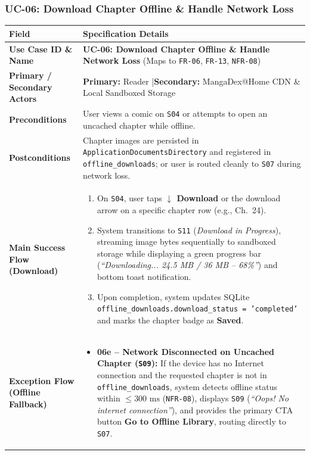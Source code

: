 \subsubsection{UC-06: Download Chapter Offline \& Handle Network Loss}
\begin{table}[H]
\footnotesize
\renewcommand{\arraystretch}{1.22}
\begin{tabularx}{\textwidth}{L{3.2cm} Y}
\toprule
{}
\textbf{Field} & \textbf{Specification Details} \\
\midrule
\textbf{Use Case ID \& Name} & \textbf{UC-06: Download Chapter Offline \& Handle Network Loss} (Maps to \texttt{FR-06}, \texttt{FR-13}, \texttt{NFR-08}) \\
\textbf{Primary / Secondary Actors} & \textbf{Primary:} Reader \quad|\quad \textbf{Secondary:} MangaDex@Home CDN \& Local Sandboxed Storage \\
\textbf{Preconditions} & User views a comic on \texttt{S04} or attempts to open an uncached chapter while offline. \\
\textbf{Postconditions} & Chapter images are persisted in \texttt{ApplicationDocumentsDirectory} and registered in \texttt{offline\_downloads}; or user is routed cleanly to \texttt{S07} during network loss. \\
\textbf{Main Success Flow (Download)} &
\begin{enumerate}[nosep,leftmargin=1.4em]
    \item On \texttt{S04}, user taps \textbf{$\downarrow$ Download} or the download arrow on a specific chapter row (e.g., Ch.\ 24).
    \item System transitions to \texttt{S11} (\textit{Download in Progress}), streaming image bytes sequentially to sandboxed storage while displaying a green progress bar (\textit{``Downloading... 24.5 MB / 36 MB -- 68\%''}) and bottom toast notification.
    \item Upon completion, system updates SQLite \texttt{offline\_downloads.download\_status = 'completed'} and marks the chapter badge as \textbf{Saved}.
\end{enumerate} \\
\textbf{Exception Flow (Offline Fallback)} &
\begin{itemize}[nosep,leftmargin=1.4em]
    \item \textbf{06e -- Network Disconnected on Uncached Chapter (\texttt{S09}):} If the device has no Internet connection and the requested chapter is not in \texttt{offline\_downloads}, system detects offline status within $\le 300\text{ ms}$ (\texttt{NFR-08}), displays \texttt{S09} (\textit{``Oops! No internet connection''}), and provides the primary CTA button \textbf{Go to Offline Library}, routing directly to \texttt{S07}.
\end{itemize} \\
\bottomrule
\end{tabularx}
\end{table}

